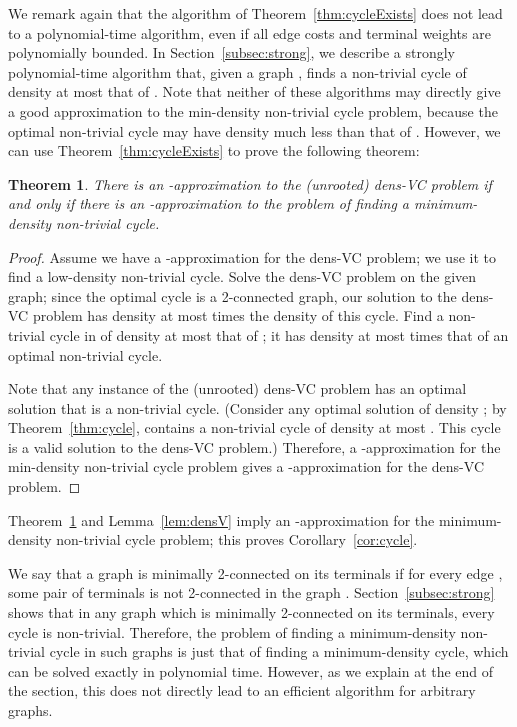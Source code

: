 \documentclass[11pt]{article}
\newtheorem{theorem}[lemma]{Theorem}
\newcommand{\densV}{dens-{\sc VC} }
\begin{document}
We remark again that the algorithm of Theorem~\ref{thm:cycleExists} does
not lead to a polynomial-time algorithm, even if all edge costs and
terminal weights are polynomially bounded. In Section~\ref{subsec:strong},
we describe a strongly polynomial-time algorithm that, given a graph ,
finds a non-trivial cycle of density at most that of .
Note that neither of these algorithms may directly give a good
approximation to the min-density non-trivial cycle problem, because
the optimal non-trivial cycle may have density much less than that of
.  However, we can use Theorem~\ref{thm:cycleExists} to prove the
following theorem:

\begin{theorem}\label{thm:equivalence}
  There is an -approximation to the (unrooted) \densV problem
  if and only if there is an -approximation to the problem of
  finding a minimum-density non-trivial cycle.
\end{theorem}
\begin{proof}
  Assume we have a -approximation for the \densV
  problem; we use it to find a low-density non-trivial cycle. Solve
  the \densV problem on the given graph; since the optimal cycle is a
  2-connected graph, our solution  to the \densV problem has
  density at most  times the density of this cycle.
  Find a non-trivial cycle in  of density at most that of ; it
  has density at most  times that of an optimal
  non-trivial cycle.

  Note that any instance of the (unrooted) \densV problem has an
  optimal solution that is a non-trivial cycle.  (Consider any optimal
  solution  of density ; by Theorem~\ref{thm:cycle}, 
  contains a non-trivial cycle of density at most . This cycle
  is a valid solution to the \densV problem.) Therefore, a
  -approximation for the min-density non-trivial cycle
  problem gives a -approximation for the \densV problem.
\end{proof}

Theorem~\ref{thm:equivalence} and Lemma~\ref{lem:densV} imply 
an -approximation for the minimum-density non-trivial cycle
problem; this proves Corollary~\ref{cor:cycle}.

We say that a graph  is minimally 2-connected on its terminals
if for every edge , some pair of terminals is not 2-connected
in the graph .  Section~\ref{subsec:strong} shows that in any
graph which is minimally 2-connected on its terminals, every cycle is
non-trivial.  Therefore, the problem of finding a minimum-density
non-trivial cycle in such graphs is just that of finding a
minimum-density cycle, which can be solved exactly in polynomial
time. However, as we explain at the end of the section, this does not
directly lead to an efficient algorithm for arbitrary graphs.
\end{document}
